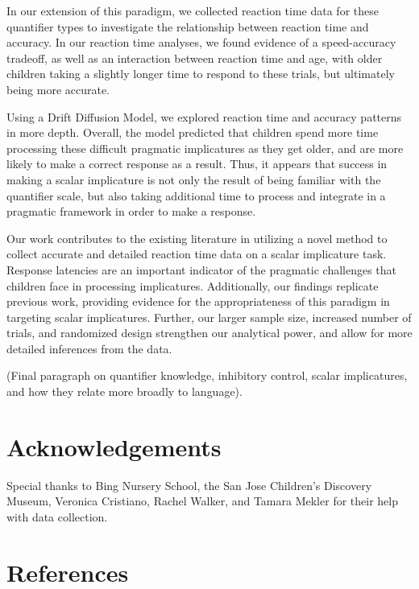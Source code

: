 \documentclass[10pt, letterpaper]{article}
\begin{document}
In our extension of this paradigm, we collected reaction time data for
these quantifier types to investigate the relationship between reaction
time and accuracy. In our reaction time analyses, we found evidence of a
speed-accuracy tradeoff, as well as an interaction between reaction time
and age, with older children taking a slightly longer time to respond to
these trials, but ultimately being more accurate.

Using a Drift Diffusion Model, we explored reaction time and accuracy
patterns in more depth. Overall, the model predicted that children spend
more time processing these difficult pragmatic implicatures as they get
older, and are more likely to make a correct response as a result. Thus,
it appears that success in making a scalar implicature is not only the
result of being familiar with the quantifier scale, but also taking
additional time to process and integrate in a pragmatic framework in
order to make a response.

Our work contributes to the existing literature in utilizing a novel
method to collect accurate and detailed reaction time data on a scalar
implicature task. Response latencies are an important indicator of the
pragmatic challenges that children face in processing implicatures.
Additionally, our findings replicate previous work, providing evidence
for the appropriateness of this paradigm in targeting scalar
implicatures. Further, our larger sample size, increased number of
trials, and randomized design strengthen our analytical power, and allow
for more detailed inferences from the data.

(Final paragraph on quantifier knowledge, inhibitory control, scalar
implicatures, and how they relate more broadly to language).

\section{Acknowledgements}\label{acknowledgements}

Special thanks to Bing Nursery School, the San Jose Children's Discovery
Museum, Veronica Cristiano, Rachel Walker, and Tamara Mekler for their
help with data collection.

\section{References}\label{references}

\setlength{\parindent}{-0.1in} \setlength{\leftskip}{0.125in} \noindent
\end{document}
